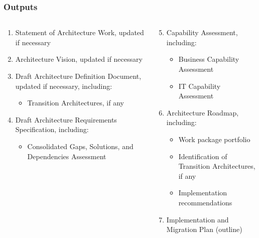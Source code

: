 \documentclass[aspectratio=169, table]{beamer}
\begin{document}
	
	\begin{frame}
		\frametitle{Outputs}
		\vspace{25pt}
		\begin{columns}[onlytextwidth]
			\begin{column}{0.50\textwidth}
				\begin{enumerate}
					\item Statement of Architecture Work, updated if necessary
					\item Architecture Vision, updated if necessary
					\item Draft Architecture Definition Document, updated if necessary, including:
					\begin{itemize}
						\item Transition Architectures, if any
					\end{itemize}
					\item Draft Architecture Requirements Specification, including:
					\begin{itemize}
						\item Consolidated Gaps, Solutions, and Dependencies Assessment
					\end{itemize}
					
				\end{enumerate}
				
			\end{column}
			\begin{column}{0.50\textwidth}
				\begin{enumerate}
					\setcounter{enumi}{4}
					\item Capability Assessment, including:
					\begin{itemize}
						\item Business Capability Assessment
						\item IT Capability Assessment
					\end{itemize}
					\item Architecture Roadmap, including:
					\begin{itemize}
						\item Work package portfolio
						\item Identification of Transition Architectures, if any
						\item Implementation recommendations
					\end{itemize}
					\item Implementation and Migration Plan (outline)
				\end{enumerate}
			\end{column}
		\end{columns}
	\end{frame}
	
\end{document}
